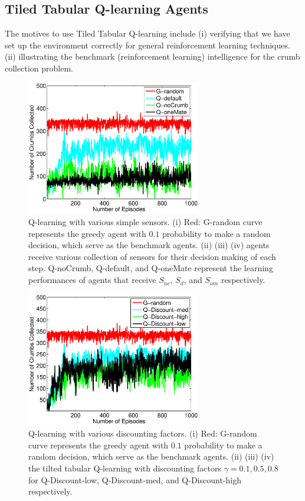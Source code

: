 \documentclass[conference]{IEEEtran}
\begin{document}
\subsection{Tiled Tabular Q-learning Agents}
The motives to use Tiled Tabular Q-learning include
(i) verifying that we have set up the environment correctly for general
reinforcement learning techniques. 
(ii) illustrating the benchmark (reinforcement learning) intelligence for the
crumb collection problem.

\begin{figure}[!t]
\centering
\includegraphics[width=3.0in]{./figures/RL/init_setup1.eps}
\caption{Q-learning with various simple sensors. (i) Red: G-random curve
    represents the greedy agent with $0.1$ probability to make a random
    decision, which serve as the benchmark agents. 
    (ii) (iii) (iv) agents receive various collection of sensors for their
    decision making of each step. Q-noCrumb, Q-default, and Q-oneMate
    represent the learning performances of agents that receive $S_{nc}$,
    $S_{d}$, and $S_{om}$ respectively.
} 
\label{fig:RL_init}
\end{figure}

\begin{figure}[!t]
\centering
\includegraphics[width=3.0in]{./figures/RL/init_setup2.eps}
\caption{Q-learning with various discounting factors. (i) Red: G-random curve
    represents the greedy agent with $0.1$ probability to make a random
    decision, which serve as the benchmark agents. 
    (ii) (iii) (iv) the tilted tabular Q-learning with discounting factors
    $\gamma = 0.1, 0.5, 0.8$ for Q-Discount-low, Q-Discount-med, and
    Q-Discount-high respectively.}
\label{fig:RL_init2}
\end{figure}
\end{document}
